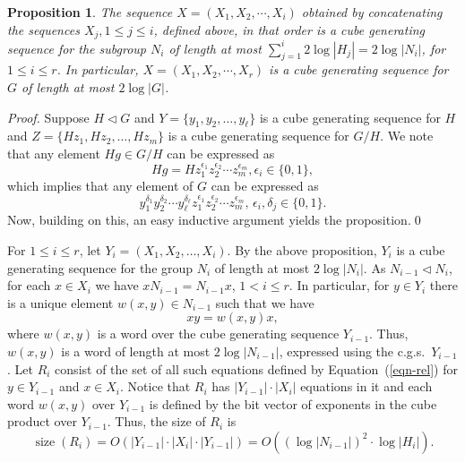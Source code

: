 \documentclass{elsarticle}
\newtheorem{prop}[theorem]{Proposition}
\newcommand{\size}{\mathop{\mathrm{size}}}
\begin{document}
\begin{prop}
  The sequence $X=(X_1, X_2, \cdots, X_i)$ obtained by concatenating
  the sequences $X_j, 1\le j\le i$, defined above, in that order is a
  cube generating sequence for the subgroup $N_i$ of length at most
  $\sum_{j=1}^i 2\log |H_j|=2\log |N_i|$, for $1\le i\le r$. In
  particular, $X=(X_1, X_2, \cdots, X_r)$ is a cube generating
  sequence for $G$ of length at most $2\log |G|$.
\end{prop}

\begin{proof}

  Suppose $H\lhd G$ and $Y=\{y_1,y_2,\ldots,y_\ell\}$ is a cube
  generating sequence for $H$ and $Z=\{Hz_1,Hz_2,\ldots,Hz_m\}$ is a
  cube generating sequence for $G/H$. We note that any element
  $Hg\in G/H$ can be expressed as
\[
Hg =  Hz_1^{\epsilon_1}z_2^{\epsilon_2}\cdots z_m^{\epsilon_m},
  \epsilon_i\in\{0,1\},
\]
which implies that any element of $G$ can be expressed as
\[y_1^{\delta_1}y_2^{\delta_2}\cdots
y_\ell^{\delta_\ell}z_1^{\epsilon_1}z_2^{\epsilon_2}\cdots
z_m^{\epsilon_m},\, \epsilon_i,\delta_j\in\{0,1\}.\]
Now, building on this, an easy inductive argument yields the proposition.\qed
\end{proof}

For $1\le i\le r$, let $Y_i=(X_1,X_2,\ldots,X_i)$. By the above
proposition, $Y_i$ is a cube generating sequence for the group $N_i$
of length at most $2\log |N_i|$. As $N_{i-1}\lhd N_i$, for each
$x\in X_i$ we have $xN_{i-1}=N_{i-1}x$, $1<i\le r$. In particular, for
$y\in Y_i$ there is a unique element $w(x,y)\in N_{i-1}$ such that
we have
\begin{equation}\label{eqn-rel}
xy=w(x,y)x,
\end{equation}
where $w(x,y)$ is a word over the cube generating sequence
$Y_{i-1}$. Thus, $w(x,y)$ is a word of length at most $2\log
|N_{i-1}|$, expressed using the c.g.s.\ $Y_{i-1}$. Let $R_i$ consist
of the set of all such equations defined by Equation~(\ref{eqn-rel})
for $y\in Y_{i-1}$ and $x\in X_i$.  Notice that $R_i$ has
$|Y_{i-1}|\cdot |X_i|$ equations in it and each word $w(x,y)$ over
$Y_{i-1}$ is defined by the bit vector of exponents in the cube
product over $Y_{i-1}$. Thus, the size of $R_i$ is
\[
\size(R_i) =
O(|Y_{i-1}|\cdot |X_i|\cdot |Y_{i-1}|)=O((\log |N_{i-1}|)^2\cdot \log
|H_i|).
\]
\end{document}
